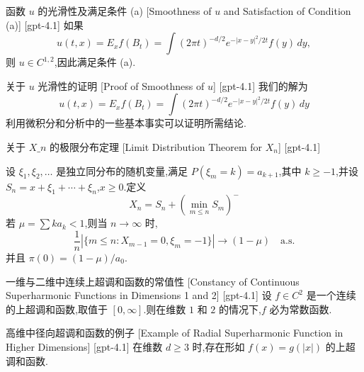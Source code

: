 \documentclass[UTF8]{ctexart}
\begin{document}
    
    
    \begin{thm}
        {函数 $
    u$ 的光滑性及满足条件 (a)}
        [Smoothness of $
    u$ and Satisfaction of Condition (a)]
        [gpt-4.1]
        如果
\[
u(t, x) = E_{x} f(B_{t}) = \int (2\pi t)^{-d/2} e^{-|x-y|^{2}/2t} f(y)\, dy,
\]
则 $
u \in C^{1,2}$,因此满足条件 (a).

    \end{thm}
    
    
    
    \begin{prf}
        {关于 $
    u$ 光滑性的证明}
        [Proof of Smoothness of $
    u$]
        [gpt-4.1]
        我们的解为
\[
u(t, x) = E_{x} f(B_{t}) = \int (2\pi t)^{-d/2} e^{-|x-y|^{2}/2t} f(y)\, dy
\]
利用微积分和分析中的一些基本事实可以证明所需结论.

    \end{prf}
    
    
    
    \begin{thm}
        {关于 $X\_n$ 的极限分布定理}
        [Limit Distribution Theorem for $X_n$]
        [gpt-4.1]
        
设 $\xi_1, \xi_2, \ldots$ 是独立同分布的随机变量,满足 $P(\xi_m = k) = a_{k+1}$,其中 $k \geq -1$,并设 $S_n = x + \xi_1 + \cdots + \xi_n$,$x \geq 0$.定义
\[
X_n = S_n + \left( \operatorname*{min}_{m \leq n} S_m \right)^-
\]
若 $\mu = \sum k a_k < 1$,则当 $n \to \infty$ 时,
\[
\frac{1}{n} \left| \{ m \leq n : X_{m-1} = 0 , \xi_m = -1 \} \right| \to (1 - \mu) \quad \mathrm{a.s.}
\]
并且 $\pi(0) = (1-\mu)/a_0$.

    \end{thm}
    
    
    
    \begin{thm}
        {一维与二维中连续上超调和函数的常值性}
        [Constancy of Continuous Superharmonic Functions in Dimensions 1 and 2]
        [gpt-4.1]
        设 $f \in C^2$ 是一个连续的上超调和函数,取值于 $[0, \infty]$.则在维数 $1$ 和 $2$ 的情况下,$f$ 必为常数函数.
    \end{thm}
    
    
    
    \begin{xmp}
        {高维中径向超调和函数的例子}
        [Example of Radial Superharmonic Function in Higher Dimensions]
        [gpt-4.1]
        在维数 $d \geq 3$ 时,存在形如 $f(x) = g(|x|)$ 的上超调和函数.
    \end{xmp}
    
\end{document}
